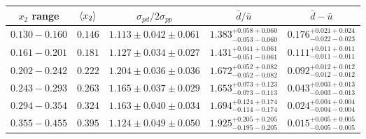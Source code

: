 {
\renewcommand{\arraystretch}{1.5}
\begin{tabular}{ccccc}
	\hline
	$x_{2}$ range & $\expval{x_{2}}$ & $\sigma_{pd}/2\sigma_{pp}$ & $\bar{d}/\bar{u}$                     & $\bar{d}-\bar{u}$                     \\ \hline
	$0.130-0.160$ & $0.146$          & $1.113\pm0.042\pm0.061$    & $1.383^{+0.058+0.060}_{-0.053-0.060}$ & $0.176^{+0.021+0.024}_{-0.022-0.023}$ \\
	$0.161-0.201$ & $0.181$          & $1.127\pm0.034\pm0.027$    & $1.431^{+0.041+0.061}_{-0.051-0.061}$ & $0.111^{+0.011+0.011}_{-0.011-0.011}$ \\
	$0.202-0.242$ & $0.222$          & $1.204\pm0.036\pm0.036$    & $1.672^{+0.052+0.082}_{-0.052-0.082}$ & $0.092^{+0.012+0.012}_{-0.012-0.012}$ \\
	$0.243-0.293$ & $0.263$          & $1.165\pm0.037\pm0.029$    & $1.653^{+0.073+0.123}_{-0.073-0.113}$ & $0.043^{+0.003+0.013}_{-0.003-0.013}$ \\
	$0.294-0.354$ & $0.324$          & $1.163\pm0.040\pm0.034$    & $1.694^{+0.124+0.174}_{-0.114-0.174}$ & $0.024^{+0.004+0.004}_{-0.004-0.004}$ \\
	$0.355-0.455$ & $0.395$          & $1.124\pm0.049\pm0.050$    & $1.925^{+0.205+0.205}_{-0.195-0.205}$ & $0.015^{+0.005+0.005}_{-0.005-0.005}$ \\ \hline
\end{tabular}
}
